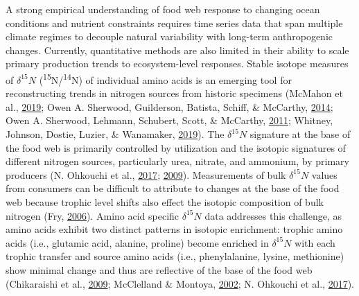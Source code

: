 \documentclass [11pt, proquest] {uwthesis}[2015/03/03]
\begin{document}
A strong empirical understanding of food web response to changing ocean
conditions and nutrient constraints requires time series data that span
multiple climate regimes to decouple natural variability with long-term
anthropogenic changes. Currently, quantitative methods are also limited
in their ability to scale primary production trends to ecosystem-level
responses. Stable isotope measures of \(\delta^{15}N\)
(\textsuperscript{15}N/\textsuperscript{14}N) of individual amino acids
is an emerging tool for reconstructing trends in nitrogen sources from
historic specimens (McMahon et al.,
\protect\hyperlink{ref-McMahon2019}{2019}; Owen A. Sherwood, Guilderson,
Batista, Schiff, \& McCarthy,
\protect\hyperlink{ref-Sherwood2014}{2014}; Owen A. Sherwood, Lehmann,
Schubert, Scott, \& McCarthy,
\protect\hyperlink{ref-Sherwood2011}{2011}; Whitney, Johnson, Dostie,
Luzier, \& Wanamaker, \protect\hyperlink{ref-Whitney2019}{2019}). The
\(\delta^{15}N\) signature at the base of the food web is primarily
controlled by utilization and the isotopic signatures of different
nitrogen sources, particularly urea, nitrate, and ammonium, by primary
producers (N. Ohkouchi et al.,
\protect\hyperlink{ref-Ohkouchi2017}{2017};
\protect\hyperlink{ref-Graham2010}{2009}). Measurements of bulk
\(\delta^{15}N\) values from consumers can be difficult to attribute to
changes at the base of the food web because trophic level shifts also
effect the isotopic composition of bulk nitrogen (Fry,
\protect\hyperlink{ref-Fry2006}{2006}). Amino acid specific
\(\delta^{15}N\) data addresses this challenge, as amino acids exhibit
two distinct patterns in isotopic enrichment: trophic amino acids (i.e.,
glutamic acid, alanine, proline) become enriched in \(\delta^{15}N\)
with each trophic transfer and source amino acids (i.e., phenylalanine,
lysine, methionine) show minimal change and thus are reflective of the
base of the food web (Chikaraishi et al.,
\protect\hyperlink{ref-Chikaraishi2009}{2009}; McClelland \& Montoya,
\protect\hyperlink{ref-McClelland2002}{2002}; N. Ohkouchi et al.,
\protect\hyperlink{ref-Ohkouchi2017}{2017}).
\end{document}
